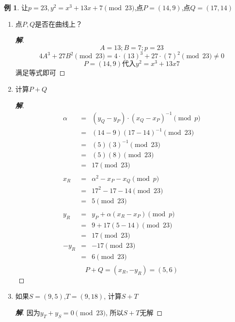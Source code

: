 \documentclass{article}
\theoremstyle{definition}
\newtheorem{example}{\indent 例}
\newenvironment{solution}{\begin{proof}[\indent\bf 解]}{\end{proof}}
\begin{document}
\begin{example}
让$p = 23, y^2 = x^3+13x + 7 \pmod{23}$,点$P = (14,9)$,点$Q = (17,14)$
\begin{enumerate}
\item 点$P,Q$是否在曲线上？
~\\

\begin{solution}
$$A = 13;B = 7;p = 23$$
$$4A^3 +27B^2 \pmod{23} = 4 \cdot (13)^3 +27 \cdot (7)^2 \pmod{23} \ne 0$$
$$P = (14,9) \mbox{代入} y^2 = x^3+13x 7$$满足等式即可
\end{solution}
\item 计算$P+Q$
\begin{solution}
\begin{eqnarray}   
\label{eq}
\alpha &=&\left(y_{Q}-y_{P}\right) \cdot\left(x_{Q}-x_{P}\right)^{-1} \pmod{p}\nonumber \\ &=& (14-9)(17-14)^{-1}\pmod{23}\nonumber \\ 
&=& (5)(3)^{-1}\pmod{23}\nonumber \\ 
&=& (5)(8)\pmod{23}\nonumber \\ 
&=& 17 \pmod{23}\nonumber \\ 
&&\nonumber \\ 
x_{R} &=& \alpha^{2}-x_{P}-x_{Q}\pmod{p} \nonumber \\ 
&=& 17^2 - 17 - 14 \pmod{23}\nonumber \\ 
&=& 5 \pmod{23}\nonumber \\ 
&&\nonumber \\ 
y_{R} &=& y_{P}+\alpha\left(x_{R}-x_{P}\right) \pmod{p}\nonumber \\ 
&=& 9 + 17(5-14)\pmod{23}\nonumber \\ 
&=& 17\pmod{23}\nonumber \\ 
-y_{R}&=& -17\pmod{23}\nonumber \\ 
&=& 6\pmod{23}\nonumber \\ 
\nonumber 
\end{eqnarray}
$$P+Q = (x_{R},-y_{R})=(5,6)$$
\end{solution}
\item 如果$S = (9,5)$,$T = (9,18)$, 计算$S+T$
\begin{solution}
因为$y_T + y_S = 0 \pmod{23}$, 所以$S+T$无解
\end{solution}
\end{enumerate}
\end{example}

~\\
\end{document}
